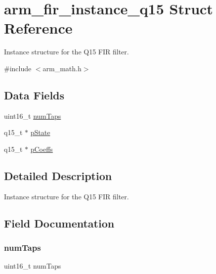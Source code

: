\hypertarget{structarm__fir__instance__q15}{}\section{arm\+\_\+fir\+\_\+instance\+\_\+q15 Struct Reference}
\label{structarm__fir__instance__q15}


Instance structure for the Q15 F\+IR filter.  




{\ttfamily \#include $<$arm\+\_\+math.\+h$>$}

\subsection*{Data Fields}
\begin{DoxyCompactItemize}
\item 
uint16\+\_\+t \mbox{\hyperlink{structarm__fir__instance__q15_a751941891e47f522a7f5375fe8990aac}{num\+Taps}}
\item 
q15\+\_\+t $\ast$ \mbox{\hyperlink{structarm__fir__instance__q15_ae29dfdb736374fcddaeaec4b7770170c}{p\+State}}
\item 
q15\+\_\+t $\ast$ \mbox{\hyperlink{structarm__fir__instance__q15_a7ca181a37f714d174445f486bebce26f}{p\+Coeffs}}
\end{DoxyCompactItemize}


\subsection{Detailed Description}
Instance structure for the Q15 F\+IR filter. 

\subsection{Field Documentation}
\mbox{\label{structarm__fir__instance__q15_a751941891e47f522a7f5375fe8990aac}} 
\subsubsection{\texorpdfstring{num\+Taps}{numTaps}}
{\footnotesize\ttfamily uint16\+\_\+t num\+Taps}

